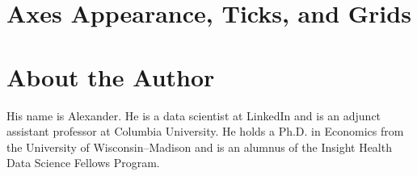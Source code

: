 \documentclass{tex/kdp} %
\begin{document}
\chapter{Axes Appearance, Ticks, and Grids}\label{chapter:axes}



\backmatter
\printbibliography
\chapter*{About the Author}
His name is Alexander. He is a data scientist at LinkedIn and is an adjunct assistant professor at Columbia University. He holds a Ph.D. in Economics from the University of Wisconsin–Madison and is an alumnus of the Insight Health Data Science Fellows Program. \faHandPeaceO
\end{document}
